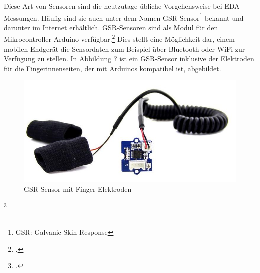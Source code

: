 Diese Art von Sensoren sind die heutzutage übliche Vorgehensweise bei EDA-Messungen. Häufig sind sie auch unter dem Namen GSR-Sensor\footnote{GSR: Galvanic Skin Response} bekannt und darunter im Internet erhältlich. GSR-Sensoren sind als Modul für den Mikrocontroller Arduino verfügbar.\footcite[beispielsweise:][]{Gro18} Dies stellt eine Möglichkeit dar, einem mobilen Endgerät die Sensordaten zum Beispiel über Bluetooth oder WiFi zur Verfügung zu stellen. In Abbildung ? ist ein GSR-Sensor inklusive der Elektroden für die Fingerinnenseiten, der mit Arduinos kompatibel ist, abgebildet.
\begin{figure}[h]
	\centering
	\includegraphics[width=16cm]{Bilder/sensor.jpg}
	\caption[GSR-Sensor mit Finger-Elektroden]{GSR-Sensor mit Finger-Elektroden\footnotemark}
\end{figure}%
\footcitetext{Gro18}
